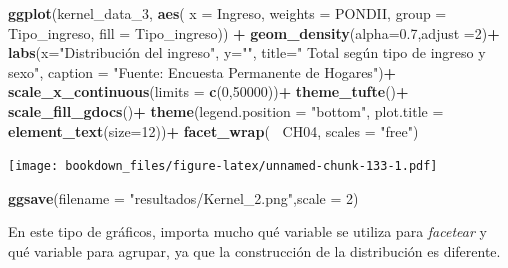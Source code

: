 \documentclass[]{book}
\newenvironment{Shaded}{\begin{snugshade}}{\end{snugshade}}
\newcommand{\DataTypeTok}[1]{\textcolor[rgb]{0.13,0.29,0.53}{#1}}
\newcommand{\DecValTok}[1]{\textcolor[rgb]{0.00,0.00,0.81}{#1}}
\newcommand{\FloatTok}[1]{\textcolor[rgb]{0.00,0.00,0.81}{#1}}
\newcommand{\KeywordTok}[1]{\textcolor[rgb]{0.13,0.29,0.53}{\textbf{#1}}}
\newcommand{\NormalTok}[1]{#1}
\newcommand{\OperatorTok}[1]{\textcolor[rgb]{0.81,0.36,0.00}{\textbf{#1}}}
\newcommand{\StringTok}[1]{\textcolor[rgb]{0.31,0.60,0.02}{#1}}
\begin{document}
\begin{Shaded}
\begin{Highlighting}[]
  \KeywordTok{ggplot}\NormalTok{(kernel_data_}\DecValTok{3}\NormalTok{, }\KeywordTok{aes}\NormalTok{(}
  \DataTypeTok{x =}\NormalTok{ Ingreso,}
  \DataTypeTok{weights =}\NormalTok{ PONDII,}
  \DataTypeTok{group =}\NormalTok{ Tipo_ingreso,}
  \DataTypeTok{fill =}\NormalTok{ Tipo_ingreso)) }\OperatorTok{+}
\StringTok{  }\KeywordTok{geom_density}\NormalTok{(}\DataTypeTok{alpha=}\FloatTok{0.7}\NormalTok{,}\DataTypeTok{adjust =}\DecValTok{2}\NormalTok{)}\OperatorTok{+}
\StringTok{  }\KeywordTok{labs}\NormalTok{(}\DataTypeTok{x=}\StringTok{"Distribución del ingreso"}\NormalTok{, }\DataTypeTok{y=}\StringTok{""}\NormalTok{,}
       \DataTypeTok{title=}\StringTok{" Total según tipo de ingreso y sexo"}\NormalTok{, }
       \DataTypeTok{caption =} \StringTok{"Fuente: Encuesta Permanente de Hogares"}\NormalTok{)}\OperatorTok{+}
\StringTok{  }\KeywordTok{scale_x_continuous}\NormalTok{(}\DataTypeTok{limits =} \KeywordTok{c}\NormalTok{(}\DecValTok{0}\NormalTok{,}\DecValTok{50000}\NormalTok{))}\OperatorTok{+}
\StringTok{  }\KeywordTok{theme_tufte}\NormalTok{()}\OperatorTok{+}
\StringTok{  }\KeywordTok{scale_fill_gdocs}\NormalTok{()}\OperatorTok{+}
\StringTok{  }\KeywordTok{theme}\NormalTok{(}\DataTypeTok{legend.position =} \StringTok{"bottom"}\NormalTok{,}
        \DataTypeTok{plot.title      =} \KeywordTok{element_text}\NormalTok{(}\DataTypeTok{size=}\DecValTok{12}\NormalTok{))}\OperatorTok{+}
\StringTok{  }\KeywordTok{facet_wrap}\NormalTok{(}\OperatorTok{~}\StringTok{ }\NormalTok{CH04, }\DataTypeTok{scales =} \StringTok{"free"}\NormalTok{)}
\end{Highlighting}
\end{Shaded}

\texttt{[image: bookdown\_files/figure-latex/unnamed-chunk-133-1.pdf]}

\begin{Shaded}
\begin{Highlighting}[]
\KeywordTok{ggsave}\NormalTok{(}\DataTypeTok{filename =} \StringTok{"resultados/Kernel_2.png"}\NormalTok{,}\DataTypeTok{scale =} \DecValTok{2}\NormalTok{)}
\end{Highlighting}
\end{Shaded}

En este tipo de gráficos, importa mucho qué variable se utiliza para \emph{facetear} y qué variable para agrupar, ya que la construcción de la distribución es diferente.
\end{document}
